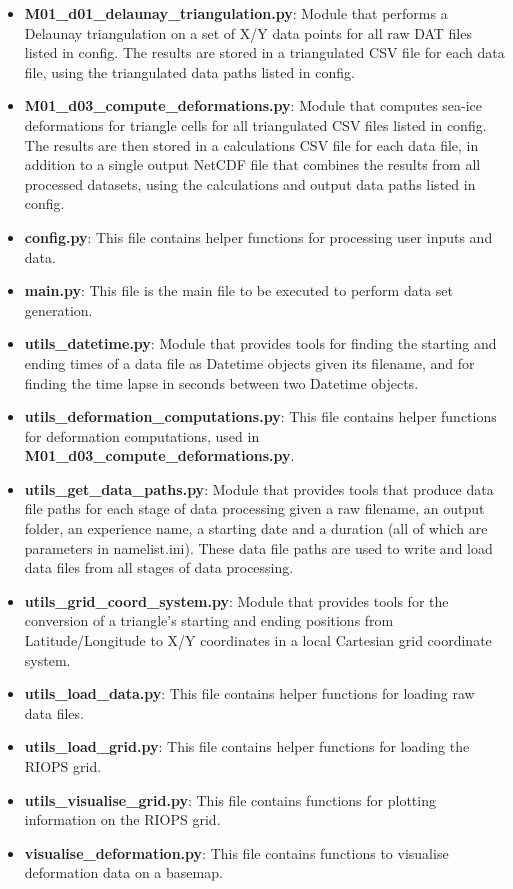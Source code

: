 \documentclass{article}
\begin{document}
        \begin{itemize}
            \item \textbf{M01\_d01\_delaunay\_triangulation.py}: Module that performs a Delaunay triangulation on a set of X/Y data points for all raw DAT files listed in config. The results are stored in a triangulated CSV file for each data file, using the triangulated data paths listed in config.
            \item \textbf{M01\_d03\_compute\_deformations.py}: Module that computes sea-ice deformations for triangle cells for all triangulated CSV files listed in config. The results are then
            stored in a calculations CSV file for each data file, in addition to a single output NetCDF file that combines the results from all processed datasets, using the calculations and output data paths listed in config.
            \item \textbf{config.py}: This file contains helper functions for processing user inputs and data.
            \item \textbf{main.py}: This file is the main file to be executed to perform data set generation.
            \item \textbf{utils\_datetime.py}: Module that provides tools for finding the starting and ending times of a data file as Datetime objects given its filename, and for finding the time lapse in seconds between two Datetime objects.
            \item \textbf{utils\_deformation\_computations.py}: This file contains helper functions for deformation computations, used in \textbf{M01\_d03\_compute\_deformations.py}.
            \item \textbf{utils\_get\_data\_paths.py}: Module that provides tools that produce data file paths for each stage of data processing given a raw filename, an output folder, an experience name, a starting date and a duration (all of which are parameters in namelist.ini). These data file paths are used to write and load data files from all stages of data processing.
            \item \textbf{utils\_grid\_coord\_system.py}: Module that provides tools for the conversion of a triangle’s starting and ending positions from Latitude/Longitude to X/Y coordinates in a local Cartesian grid coordinate system.
            \item \textbf{utils\_load\_data.py}: This file contains helper functions for loading raw data files.
            \item \textbf{utils\_load\_grid.py}: This file contains helper functions for loading the RIOPS grid.
            \item \textbf{utils\_visualise\_grid.py}: This file contains functions for plotting information on the RIOPS grid.
            \item \textbf{visualise\_deformation.py}: This file contains functions to visualise deformation data on a basemap.
        \end{itemize}
\end{document}
